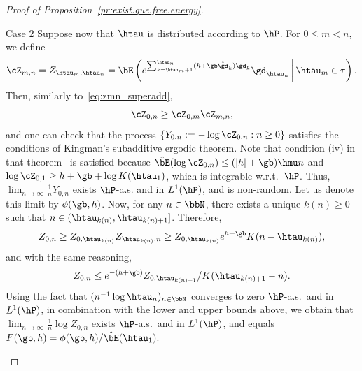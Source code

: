 \begin{proof}[Proof of Proposition~\ref{pr:exist.que.free.energy}]
\begin{laststep}{Case 2}
Suppose now that $\htau$ is distributed according to $\hP$. For $0 \leq m < n$, we define
\begin{equation}
\cZ_{m,n} = Z_{\htau_m,\htau_n} = \bE \left(e^{\sum_{k=\htau_m+1}^{\htau_n} (h + \gb \hat \gd_k) \gd_k} \gd_{\htau_n} \,\middle|\, \htau_m \in \tau \right).
\end{equation}
Then, similarly to~\eqref{eq:zmn_superadd},
\begin{equation}
\cZ_{0,n} \geq \cZ_{0,m} \cZ_{m,n},
\end{equation}
and one can check that the process $\{Y_{0,n} := - \log \cZ_{0,n}: n \geq 0\}$ satisfies the conditions of Kingman's subadditive ergodic theorem. Note that condition (iv) in that theorem~\cite[Theorem~7.4.1]{Du10} is satisfied because $\hat \bE (\log \cZ_{0,n}) \leq (|h| + \gb) \hmu n$ and $\log \cZ_{0,1} \geq h + \gb + \log K(\htau_1)$, which is integrable w.r.t.~$\hP$. Thus, $\lim_{n \to \infty} \frac{1}{n} Y_{0,n}$ exists $\hP$-a.s. and in $L^1(\hP)$, and is non-random. Let us denote this limit by $\phi(\gb,h)$. Now, for any $n \in \bbN$, there exists a unique $k(n) \geq 0$ such that $n \in (\htau_{k(n)},\htau_{k(n)+1}]$. Therefore,
\begin{equation}
Z_{0,n} \geq Z_{0,\htau_{k(n)}} Z_{\htau_{k(n)},n} \geq Z_{0,\htau_{k(n)}} e^{h + \gb} K(n - \htau_{k(n)}),
\end{equation}
and with the same reasoning,
\begin{equation}
Z_{0,n} \leq e^{- (h + \gb)} Z_{0,\htau_{k(n)+1}} / K(\htau_{k(n)+1} - n).
\end{equation}
Using the fact that $(n^{-1} \log \htau_n)_{n \in \bbN}$ converges to zero $\hP$-a.s.~and in $L^1(\hP)$, in combination with the lower and upper bounds above, we obtain that $\lim_{n \to \infty} \frac{1}{n} \log Z_{0,n}$ exists $\hP$-a.s.~and in $L^1(\hP)$, and equals $F(\gb,h) = \phi(\gb,h) / \hat \bE(\htau_1).$


\end{laststep}
\end{proof}
